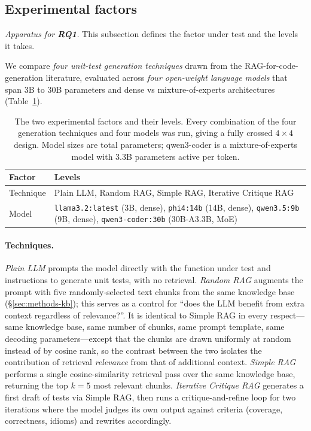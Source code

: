 \documentclass[smallextended]{svjour3}
\begin{document}
\subsection{Experimental factors}\label{sec:methods-factors}

\emph{Apparatus for \textbf{RQ1}.} This subsection defines the factor
under test and the levels it takes.


We compare \emph{four unit-test generation techniques} drawn from the
RAG-for-code-generation literature, evaluated across \emph{four
open-weight language models} that span 3B to 30B parameters and
dense vs mixture-of-experts architectures (Table~\ref{tab:factors}).

\begin{table}[t]
\centering
\caption{The two experimental factors and their levels. Every
combination of the four generation techniques and four models was
run, giving a fully crossed $4 \times 4$ design. Model sizes are
total parameters; qwen3-coder is a mixture-of-experts model with
3.3B parameters active per token.}\label{tab:factors}
\begin{tabularx}{\textwidth}{@{}lX@{}}
\toprule
\textbf{Factor} & \textbf{Levels} \\
\midrule
Technique & Plain LLM, Random RAG, Simple RAG, Iterative Critique RAG \\
Model & \texttt{llama3.2:latest} (3B, dense),
 \texttt{phi4:14b} (14B, dense),
 \texttt{qwen3.5:9b} (9B, dense),
 \texttt{qwen3-coder:30b} (30B-A3.3B, MoE) \\
\bottomrule
\end{tabularx}
\end{table}

\paragraph{Techniques.}
\emph{Plain LLM} prompts the model directly with the function under
test and instructions to generate unit tests, with no retrieval.
\emph{Random RAG} augments the prompt with five randomly-selected
text chunks from the same knowledge base
(\S\ref{sec:methods-kb}); this serves as a control for ``does the LLM
benefit from extra context regardless of relevance?''. It is
identical to Simple RAG in every respect---same knowledge base, same
number of chunks, same prompt template, same decoding
parameters---except that the chunks are drawn uniformly at random
instead of by cosine rank, so the contrast between the two isolates
the contribution of retrieval \emph{relevance} from that of
additional context. \emph{Simple RAG} performs a single
cosine-similarity retrieval pass over the same knowledge base,
returning the top $k = 5$ most relevant chunks. \emph{Iterative Critique
RAG} generates a first draft of tests via Simple RAG, then runs a
critique-and-refine loop for two iterations where the model judges
its own output against criteria (coverage, correctness, idioms) and
rewrites accordingly.
\end{document}
